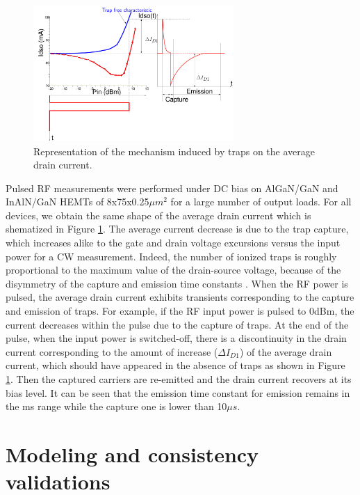 \documentclass[conference]{IEEEtran}
\begin{document}
\begin{figure}[ht!] %
\centering
\includegraphics[width=3in]{Courant_2.pdf}
\caption{Representation of the mechanism induced by traps on the average drain current.}
\label{Courant_2}
\end{figure}

Pulsed RF measurements were performed under DC bias on  AlGaN/GaN and InAlN/GaN HEMTs of 8x75x0.25$\mu m^2$ for a large number of output loads. For all devices, we obtain the same shape of the average drain current which is shematized in Figure \ref{Courant_2}. The average current decrease is due to the trap capture, which increases alike to the gate and drain voltage excursions versus the input power for a CW measurement. Indeed, the number of ionized traps is roughly proportional to the maximum value of the drain-source voltage, because of the disymmetry of the capture and emission time constants \cite{163456}.  When the RF power is pulsed, the average drain current exhibits transients  corresponding to the capture and emission of traps. For example, if the RF input power is pulsed to 0dBm, the current decreases  within the pulse due to the capture of traps. At the end of the pulse, when the input power is switched-off, there is a discontinuity in the drain current corresponding to the amount of increase ($\Delta I_{D1}$) of the average drain current, which should have appeared in the absence of traps as shown in Figure \ref{Courant_2}. Then the captured carriers are re-emitted and the drain current recovers at its bias level. It can be seen that the emission time constant for emission remains in the ms range while the capture one is lower than 10$\mu s$.



\section{Modeling and consistency validations}
\end{document}
